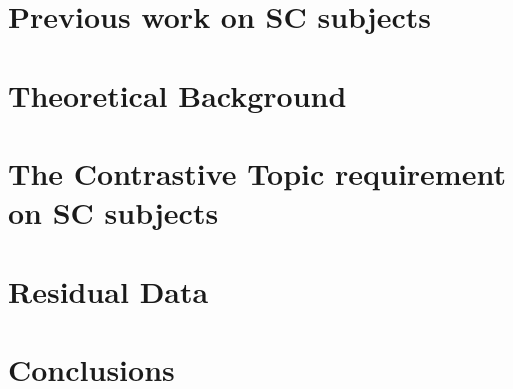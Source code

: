 \documentclass[letterpaper]{article}
\begin{document}
\section{Previous work on SC subjects}\label{sec:LitReview}

\section{Theoretical Background}\label{sec:TheoryBackground}

\section{The Contrastive Topic requirement on SC subjects}\label{sec:MainArgument}

\section{Residual Data}\label{sec:Leftovers}

\section{Conclusions}\label{sec:Conclusion}
\printbibliography
\end{document}
